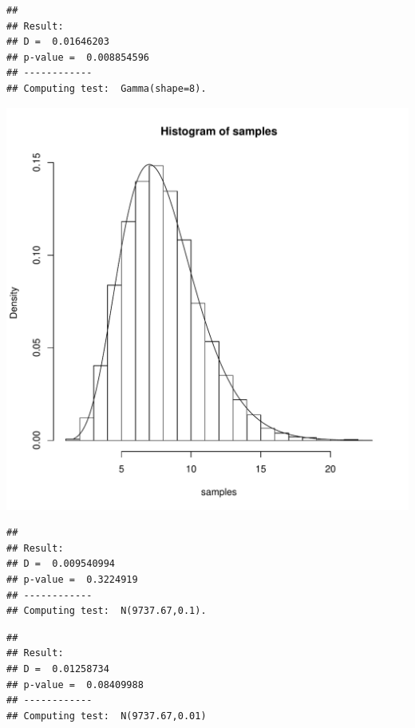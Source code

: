 \documentclass{llncs}\usepackage[]{graphicx}\usepackage[]{color}
\makeatletter
\def\maxwidth{ %
  \ifdim\Gin@nat@width>\linewidth
    \linewidth
  \else
    \Gin@nat@width
  \fi
}
\newenvironment{kframe}{%
 \def\at@end@of@kframe{}%
 \ifinner\ifhmode%
  \def\at@end@of@kframe{\end{minipage}}%
  \begin{minipage}{\columnwidth}%
 \fi\fi%
 \def\FrameCommand##1{\hskip\@totalleftmargin \hskip-\fboxsep
 \colorbox{shadecolor}{##1}\hskip-\fboxsep
     \hskip-\linewidth \hskip-\@totalleftmargin \hskip\columnwidth}%
 \MakeFramed {\advance\hsize-\width
   \@totalleftmargin\z@ \linewidth\hsize
   \@setminipage}}%
 {\par\unskip\endMakeFramed%
 \at@end@of@kframe}
\newenvironment{knitrout}{}{} %
\makeatother
\begin{document}
\begin{knitrout}
\begin{kframe}\begin{lstlisting}[basicstyle=\ttfamily,breaklines=true]
## 
## Result:
## D =  0.01646203 
## p-value =  0.008854596 
## ------------
## Computing test:  Gamma(shape=8).
\end{lstlisting}
\end{kframe}
\includegraphics[width=\maxwidth]{figure/Rt-16} 
\begin{kframe}\begin{lstlisting}[basicstyle=\ttfamily,breaklines=true]
## 
## Result:
## D =  0.009540994 
## p-value =  0.3224919 
## ------------
## Computing test:  N(9737.67,0.1).
\end{lstlisting}
\begin{lstlisting}[basicstyle=\ttfamily,breaklines=true]
## 
## Result:
## D =  0.01258734 
## p-value =  0.08409988 
## ------------
## Computing test:  N(9737.67,0.01)
\end{lstlisting}



\end{kframe}
\end{knitrout}
\end{document}
